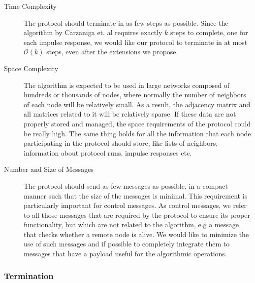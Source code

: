 \documentclass[a4paper,11pt,twoside]{report}
\begin{document}
\begin{description}
\item[Time Complexity]  The protocol should terminate in as few steps as possible. Since the algorithm by Carzaniga et. al requires exactly $k$ steps to complete, one for each impulse response, we would like our protocol to terminate in at most $\mathcal{O}(k)$ steps, even after the extensions we propose.\\
\item[Space Complexity] The algorithm is expected to be used in large networks composed of hundreds or thousands of nodes, where normally the number of neighbors of each node will be relatively small. As a result, the adjacency matrix and all matrices related to it will be relatively sparse. If these data are not properly stored and managed, the space requirements of the protocol could be really high. The same thing holds for all the information that each node participating in the protocol should store, like lists of neighbors, information about protocol runs, impulse responses etc.\\
\item[Number and Size of Messages] The protocol should send as few messages as possible, in a compact manner such that the size of the messages is minimal. This requirement is particularly important for control messages. As control  messages, we refer to all those messages that are required by the protocol to ensure its proper functionality, but which are not related to the algorithm, e.g a message that checks whether a remote node is alive.  We would like to minimize the use of such messages and if possible to completely integrate them to messages that have a payload useful for the algorithmic operations.\\
\end{description}

\subsubsection*{Termination}
\end{document}
